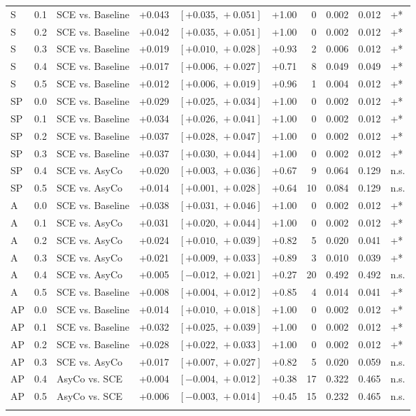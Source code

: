 \begin{landscape}
\begin{scriptsize}
\begin{longtable}{lllrrrrrrl}
S & 0.1 & SCE vs. Baseline & +0.043 & $[+0.035,\,+0.051]$ & +1.00 & 0 & 0.002 & 0.012 & +* \\
S & 0.2 & SCE vs. Baseline & +0.042 & $[+0.035,\,+0.051]$ & +1.00 & 0 & 0.002 & 0.012 & +* \\
S & 0.3 & SCE vs. Baseline & +0.019 & $[+0.010,\,+0.028]$ & +0.93 & 2 & 0.006 & 0.012 & +* \\
S & 0.4 & SCE vs. Baseline & +0.017 & $[+0.006,\,+0.027]$ & +0.71 & 8 & 0.049 & 0.049 & +* \\
S & 0.5 & SCE vs. Baseline & +0.012 & $[+0.006,\,+0.019]$ & +0.96 & 1 & 0.004 & 0.012 & +* \\
SP & 0.0 & SCE vs. Baseline & +0.029 & $[+0.025,\,+0.034]$ & +1.00 & 0 & 0.002 & 0.012 & +* \\
SP & 0.1 & SCE vs. Baseline & +0.034 & $[+0.026,\,+0.041]$ & +1.00 & 0 & 0.002 & 0.012 & +* \\
SP & 0.2 & SCE vs. Baseline & +0.037 & $[+0.028,\,+0.047]$ & +1.00 & 0 & 0.002 & 0.012 & +* \\
SP & 0.3 & SCE vs. Baseline & +0.037 & $[+0.030,\,+0.044]$ & +1.00 & 0 & 0.002 & 0.012 & +* \\
SP & 0.4 & SCE vs. AsyCo & +0.020 & $[+0.003,\,+0.036]$ & +0.67 & 9 & 0.064 & 0.129 & n.s. \\
SP & 0.5 & SCE vs. AsyCo & +0.014 & $[+0.001,\,+0.028]$ & +0.64 & 10 & 0.084 & 0.129 & n.s. \\
A & 0.0 & SCE vs. Baseline & +0.038 & $[+0.031,\,+0.046]$ & +1.00 & 0 & 0.002 & 0.012 & +* \\
A & 0.1 & SCE vs. AsyCo & +0.031 & $[+0.020,\,+0.044]$ & +1.00 & 0 & 0.002 & 0.012 & +* \\
A & 0.2 & SCE vs. AsyCo & +0.024 & $[+0.010,\,+0.039]$ & +0.82 & 5 & 0.020 & 0.041 & +* \\
A & 0.3 & SCE vs. AsyCo & +0.021 & $[+0.009,\,+0.033]$ & +0.89 & 3 & 0.010 & 0.039 & +* \\
A & 0.4 & SCE vs. AsyCo & +0.005 & $[-0.012,\,+0.021]$ & +0.27 & 20 & 0.492 & 0.492 & n.s. \\
A & 0.5 & SCE vs. Baseline & +0.008 & $[+0.004,\,+0.012]$ & +0.85 & 4 & 0.014 & 0.041 & +* \\
AP & 0.0 & SCE vs. Baseline & +0.014 & $[+0.010,\,+0.018]$ & +1.00 & 0 & 0.002 & 0.012 & +* \\
AP & 0.1 & SCE vs. Baseline & +0.032 & $[+0.025,\,+0.039]$ & +1.00 & 0 & 0.002 & 0.012 & +* \\
AP & 0.2 & SCE vs. Baseline & +0.028 & $[+0.022,\,+0.033]$ & +1.00 & 0 & 0.002 & 0.012 & +* \\
AP & 0.3 & SCE vs. AsyCo & +0.017 & $[+0.007,\,+0.027]$ & +0.82 & 5 & 0.020 & 0.059 & n.s. \\
AP & 0.4 & AsyCo vs. SCE & +0.004 & $[-0.004,\,+0.012]$ & +0.38 & 17 & 0.322 & 0.465 & n.s. \\
AP & 0.5 & AsyCo vs. SCE & +0.006 & $[-0.003,\,+0.014]$ & +0.45 & 15 & 0.232 & 0.465 & n.s. \\
\addlinespace
\bottomrule
\end{longtable}
\end{scriptsize}
\end{landscape}
